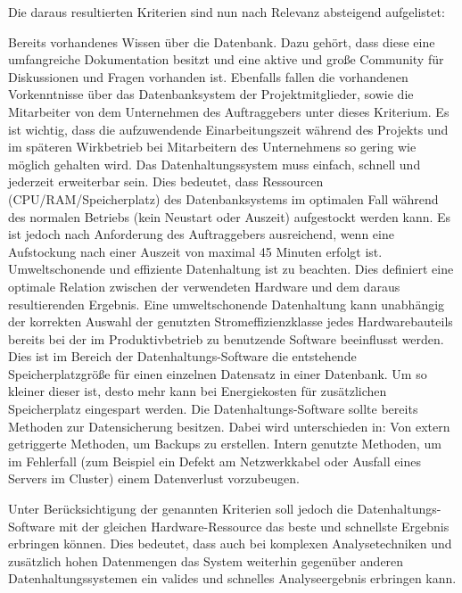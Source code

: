 {Die daraus resultierten Kriterien sind nun nach Relevanz absteigend
aufgelistet:
\begin{outline}
  \1 Bereits vorhandenes Wissen über die Datenbank. Dazu gehört, dass diese
  eine umfangreiche Dokumentation besitzt und eine aktive und große Community
  für Diskussionen und Fragen vorhanden ist. Ebenfalls fallen die vorhandenen
  Vorkenntnisse über das Datenbanksystem der Projektmitglieder, sowie die
  Mitarbeiter von dem Unternehmen des Auftraggebers unter dieses Kriterium. Es
  ist wichtig, dass die aufzuwendende Einarbeitungszeit während des Projekts
  und im späteren Wirkbetrieb bei Mitarbeitern des Unternehmens so gering wie
  möglich gehalten wird.
  \1 Das Datenhaltungssystem muss einfach, schnell und jederzeit erweiterbar
  sein. Dies bedeutet, dass Ressourcen (CPU/RAM/Speicherplatz) des
  Datenbanksystems im optimalen Fall während des normalen Betriebs (kein
  Neustart oder Auszeit) aufgestockt werden kann. Es ist jedoch nach
  Anforderung des Auftraggebers ausreichend, wenn eine Aufstockung nach einer
  Auszeit von maximal 45 Minuten erfolgt ist.
  \1 Umweltschonende und effiziente Datenhaltung ist zu beachten. Dies
  definiert eine optimale Relation zwischen der verwendeten Hardware und dem
  daraus resultierenden Ergebnis. Eine umweltschonende Datenhaltung kann
  unabhängig der korrekten Auswahl der genutzten Stromeffizienzklasse jedes
  Hardwarebauteils bereits bei der im Produktivbetrieb zu benutzende Software
  beeinflusst werden. Dies ist im Bereich der Datenhaltungs\hyp{}Software die
  entstehende Speicherplatzgröße für einen einzelnen Datensatz in einer
  Datenbank. Um so kleiner dieser ist, desto mehr kann bei Energiekosten für
  zusätzlichen Speicherplatz eingespart werden.
  \1 Die Datenhaltungs\hyp{}Software sollte bereits Methoden zur Datensicherung
  besitzen. Dabei wird unterschieden in:
    \2 Von extern getriggerte Methoden, um Backups zu erstellen.
    \2 Intern genutzte Methoden, um im Fehlerfall (zum Beispiel ein Defekt am
    Netzwerkkabel oder Ausfall eines Servers im Cluster) einem Datenverlust
    vorzubeugen.
\end{outline}

Unter Berücksichtigung der genannten Kriterien soll jedoch die
Datenhaltungs\hyp{}Software mit der gleichen Hardware\hyp{}Ressource das beste
und schnellste Ergebnis erbringen können. Dies bedeutet, dass auch bei
komplexen Analysetechniken und zusätzlich hohen Datenmengen das System
weiterhin gegenüber anderen Datenhaltungssystemen ein valides und schnelles
Analyseergebnis erbringen kann.
\nl%

}
